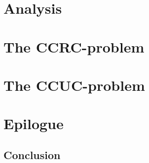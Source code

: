
\part{Analysis}\label{Analysis}




\part{The CCRC-problem}




\part{The CCUC-problem}

\part{Epilogue}

\chapter{Conclusion}



